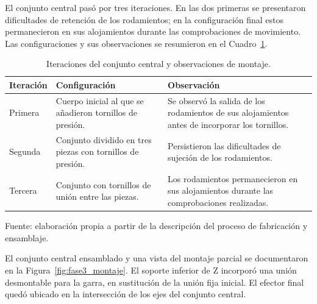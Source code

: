 El conjunto central pasó por tres iteraciones. En las dos primeras se presentaron dificultades de retención de los rodamientos; en la configuración final estos permanecieron en sus alojamientos durante las comprobaciones de movimiento. Las configuraciones y sus observaciones se resumieron en el Cuadro~\ref{tab:fase3_iteraciones}.

\begin{table}[H]
    \centering
    \caption{Iteraciones del conjunto central y observaciones de montaje.}
    \label{tab:fase3_iteraciones}
    \begin{tabular}{p{}p{}p{}}
        \hline
        Iteración & Configuración & Observación \\
        \hline
        Primera &
        Cuerpo inicial al que se añadieron tornillos de presión. &
        Se observó la salida de los rodamientos de sus alojamientos antes de incorporar los tornillos. \\

        Segunda &
        Conjunto dividido en tres piezas con tornillos de presión. &
        Persistieron las dificultades de sujeción de los rodamientos. \\

        Tercera &
        Conjunto con tornillos de unión entre las piezas. &
        Los rodamientos permanecieron en sus alojamientos durante las comprobaciones realizadas. \\
        \hline
    \end{tabular}

    \par\small\raggedright Fuente: elaboración propia a partir de la descripción del proceso de fabricación y ensamblaje.
\end{table}

El conjunto central ensamblado y una vista del montaje parcial se documentaron en la Figura~\ref{fig:fase3_montaje}. El soporte inferior de Z incorporó una unión desmontable para la garra, en sustitución de la unión fija inicial. El efector final quedó ubicado en la intersección de los ejes del conjunto central.

